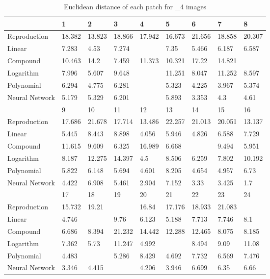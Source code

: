 \begin{table}[H]
  \begin{center}
  \resizebox{10cm}{!} {
    \begin{tabular}{|l |l |l |l |l |l |l |l |l |}\hline
          &1 &2 &3 &4 &5 &6 &7 &8\\ \hline 
        Reproduction &18.382 &13.823 &18.866 &17.942 &16.673 &21.656 &18.858 &20.307\\ 
        Linear &7.283 &4.53 &7.274 &\cellcolor{colorred}{12.56} &7.35 &5.466 &6.187 &6.587\\ 
        Compound &10.463 &14.2 &7.459 &11.373 &10.321 &17.22 &14.821 &\cellcolor{colorred}{21.988}\\ 
        Logarithm &7.996 &5.607 &9.648 &\cellcolor{colorred}{15.072} &11.251 &8.047 &11.252 &8.597\\ 
        Polynomial &6.294 &4.775 &6.281 &\cellcolor{colorred}{8.522} &5.323 &4.225 &3.967 &5.374\\ 
        Neural Network &5.179 &5.329 &6.201 &\cellcolor{colorred}{7.442} &5.893 &3.353 &4.3 &4.61\\ \hline 
          &9 &10 &11 &12 &13 &14 &15 &16\\ \hline 
        Reproduction &17.686 &21.678 &17.714 &13.486 &22.257 &21.013 &20.051 &13.137\\ 
        Linear &5.445 &8.443 &8.898 &4.056 &5.946 &4.826 &6.588 &7.729\\ 
        Compound &11.615 &9.609 &6.325 &16.989 &6.668 &\cellcolor{colorgreen}{5.001} &9.494 &5.951\\ 
        Logarithm &8.187 &12.275 &14.397 &4.5 &8.506 &6.259 &7.802 &10.192\\ 
        Polynomial &5.822 &6.148 &5.694 &4.601 &8.205 &4.654 &4.957 &6.73\\ 
        Neural Network &4.422 &6.908 &5.461 &2.904 &7.152 &3.33 &3.425 &1.7\\ \hline 
          &17 &18 &19 &20 &21 &22 &23 &24\\ \hline 
        Reproduction &15.732 &19.21 &\cellcolor{colorgreen}{8.956} &16.84 &17.176 &18.933 &21.083 &\cellcolor{colorred}{26.841}\\ 
        Linear &4.746 &\cellcolor{colorgreen}{4.019} &9.76 &6.123 &5.188 &7.713 &7.746 &8.1\\ 
        Compound &6.686 &8.394 &21.232 &14.442 &12.288 &12.465 &8.075 &8.185\\ 
        Logarithm &7.362 &5.73 &11.247 &4.992 &\cellcolor{colorgreen}{4.251} &8.494 &9.09 &11.08\\ 
        Polynomial &4.483 &\cellcolor{colorgreen}{3.894} &5.286 &8.429 &4.692 &7.732 &6.569 &7.476\\ 
        Neural Network &3.346 &4.415 &\cellcolor{colorgreen}{1.316} &4.206 &3.946 &6.699 &6.35 &6.66\\ \hline 
    \end{tabular}
  }
  \caption{Euclidean distance of each patch for _4 images }
  \end{center}
\end{table}
